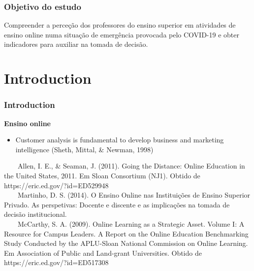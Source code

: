 \documentclass[10pt]{beamer}
\begin{document}
\begin{frame}
	\frametitle{Objetivo do estudo}
	\Large{Compreender a perceção dos professores do ensino superior em atividades de ensino online numa situação de emergência provocada pelo COVID-19 e obter indicadores para auxiliar na tomada de decisão.}

	
\end{frame}

\section{Introduction} %
\begin{comment}
Esta investigação, desenvolvida através da técnica de inquérito por questionário, pretende avaliar como é que esses docentes encararam essa realidade. O trabalho de campo foi realizado na primeira quinzena de abril de 2020 envolvendo docentes de uma instituição de ensino superior portuguesa tendo-se obtido 35 respostas válidas.

\end{comment}

\begin{frame}
	\frametitle{Introduction}
	\Large
	\textbf{Ensino online}\\
		\begin{itemize} \normalsize
			\item Customer analysis is fundamental to develop business and marketing intelligence \footnotesize(Sheth, Mittal, \& Newman, 1998)\normalsize

		\end{itemize}	

	
	
	\tiny
	~~~~Allen, I. E., \& Seaman, J. (2011). Going the Distance: Online Education in the United States, 2011. Em Sloan Consortium (NJ1). Obtido de https://eric.ed.gov/?id=ED529948 \\
	~~~~Martinho, D. S. (2014). O Ensino Online nas Instituições de Ensino Superior Privado. As perspetivas: Docente e discente e as implicações na tomada de decisão institucional.\\
	~~~~McCarthy, S. A. (2009). Online Learning as a Strategic Asset. Volume I: A Resource for Campus Leaders. A Report on the Online Education Benchmarking Study Conducted by the APLU-Sloan National Commission on Online Learning. Em Association of Public and Land-grant Universities. Obtido de https://eric.ed.gov/?id=ED517308\\

\end{frame}
\end{document}
